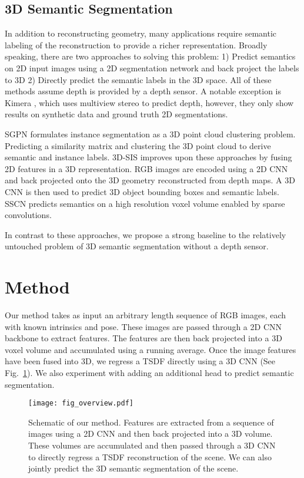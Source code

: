 \documentclass[runningheads]{llncs}
\begin{document}
\subsection{3D Semantic Segmentation}
In addition to reconstructing geometry, many applications require semantic labeling of the reconstruction to provide a richer representation. Broadly speaking, there are two approaches to solving this problem: 1) Predict semantics on 2D input images using a 2D segmentation network\cite{ badrinarayanan2015segnet,he2017mask,cheng2019panoptic} and back project the labels to 3D \cite{mccormac2017semanticfusion, narita2019panopticfusion, mccormac2018fusion++} 2) Directly predict the semantic labels in the 3D space.
All of these methods assume depth is provided by a depth sensor.
A notable exception is Kimera \cite{Rosinol20Kimera}, which uses multiview stereo \cite{hirschmuller2007stereo} to predict depth,
however, they only show results on synthetic data and ground truth 2D segmentations.

SGPN\cite{wang2017sgpn} formulates instance segmentation as a 3D point cloud clustering problem. Predicting a similarity matrix and clustering the 3D point cloud to derive semantic and instance labels. 3D-SIS\cite{hou20183dsis} improves upon these approaches by fusing 2D features in a 3D representation. RGB images are encoded using a 2D CNN and back projected onto the 3D geometry reconstructed from depth maps. A 3D CNN is then used to predict 3D object bounding boxes and semantic labels.
SSCN \cite{graham20183d} predicts semantics on a high resolution voxel volume enabled by sparse convolutions.

In contrast to these approaches, we propose a strong baseline to the relatively untouched problem of 3D semantic segmentation without a depth sensor.






\section{Method}
Our method takes as input an arbitrary length sequence of RGB images, each with known intrinsics and pose.
These images are passed through a 2D CNN backbone to extract features.
The features are then back projected into a 3D voxel volume and accumulated using a running average.
Once the image features have been fused into 3D, we regress a TSDF directly using a 3D CNN (See Fig.~\ref{fig:overview}).
We also experiment with adding an additional head to predict semantic segmentation.
\begin{figure}
\centering
\texttt{[image: fig\_overview.pdf]}
\caption{Schematic of our method. Features are extracted from a sequence of images using a 2D CNN and then back projected into a 3D volume.
These volumes are accumulated and then passed through a 3D CNN to directly regress a TSDF reconstruction of the scene.
We can also jointly predict the 3D semantic segmentation of the scene.
}
\label{fig:overview}
\end{figure}
\end{document}
